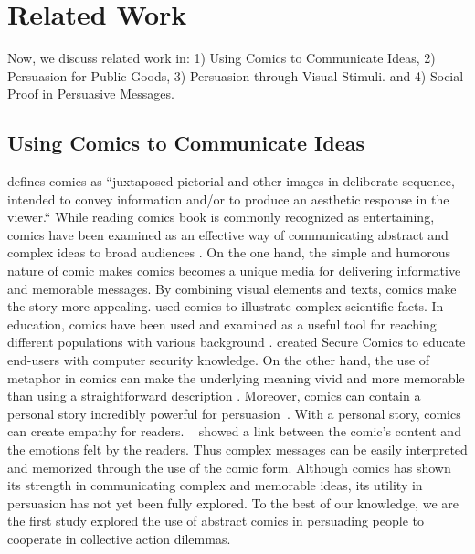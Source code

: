 \section{Related Work}
\label{sec:relatedwork}
Now, we discuss related work in: 1) Using Comics to Communicate Ideas, 2) Persuasion for Public Goods, 3) Persuasion through Visual Stimuli. and 4) Social Proof in Persuasive Messages.

\subsection{Using Comics to Communicate Ideas}
\textcite{scott1993understanding} defines comics as ``juxtaposed pictorial and other images in deliberate sequence, intended to convey information and/or to produce an aesthetic response in the viewer.`` While reading comics book is commonly recognized as entertaining, comics have been examined as an effective way of communicating abstract and complex ideas to broad audiences \cite{McDermottPB18,cary2004going,scott1993understanding, Zhang-Kennedy:2017:SCI:3206217.3206282}. On the one hand, the simple and humorous nature of comic makes comics becomes a unique media for delivering informative and memorable messages. By combining visual elements and texts, comics make the story more appealing. \textcite{McDermottPB18} used comics to illustrate complex scientific facts. In education, comics have been used and examined as a useful tool for reaching different populations with various background \cite{McDermottPB18,cary2004going,scott1993understanding}. \textcite{Zhang-Kennedy:2017:SCI:3206217.3206282} created Secure Comics to educate end-users with computer security knowledge. On the other hand, the use of metaphor in comics can make the underlying meaning vivid and more memorable than using a straightforward description \cite{McDermottPB18,scott1993understanding}. Moreover, comics can contain a personal story incredibly powerful for persuasion~\cite{weaver2017losing}. With a personal story, comics can create empathy for readers. ~\textcite{matsubara2016emotional} showed a link between the comic's content and the emotions felt by the readers. Thus complex messages can be easily interpreted and memorized through the use of the comic form. Although comics has shown its strength in communicating complex and memorable ideas, its utility in persuasion has not yet been fully explored. To the best of our knowledge, we are the first study explored the use of abstract comics in persuading people to cooperate in collective action dilemmas.  

